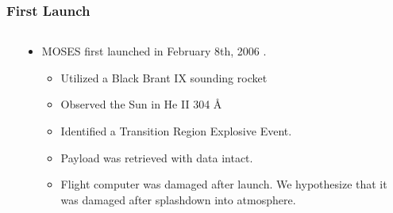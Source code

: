 \documentclass[landscape,xcolor={table}]{beamer}
\begin{document}
	\begin{frame}
		
		\frametitle{First Launch}
		
		\begin{columns}[T] %
		\begin{column}{.20\textwidth}

			
		\end{column}%
		\hfill%
		\begin{column}{.78\textwidth}
		
			\begin{itemize}
				\item MOSES first launched in February 8th, 2006 \cite{moses}.
				\begin{itemize}
					\item Utilized a Black Brant IX sounding rocket
					\item Observed the Sun in He II 304 \AA
					\item Identified a Transition Region Explosive Event.
					\item Payload was retrieved with data intact.
					\item Flight computer was damaged after launch. We hypothesize that it was damaged after splashdown into atmosphere.
				\end{itemize}
				
			\end{itemize}
		
		\end{column}%
		\end{columns}
	
	\end{frame}
		
\end{document}
